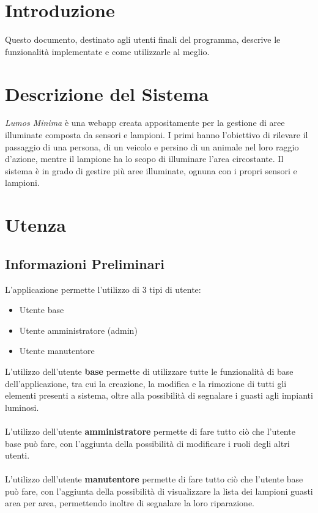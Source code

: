 \documentclass[a4paper, 12pt]{article}
\begin{document}
\makeindexdetails
\makefrontpage \makeversioni
\tableofcontents
\newpage
\clearpage
{}
\newpage
\section{Introduzione}
Questo documento, destinato agli utenti finali del programma, descrive le funzionalità implementate e come utilizzarle al meglio.

\newpage
\section{Descrizione del Sistema}
\textit{Lumos Minima} è una webapp creata appositamente per la gestione di aree illuminate composta da sensori e lampioni. I primi hanno l'obiettivo di rilevare il passaggio di una persona, di un veicolo e persino di un animale nel loro raggio d'azione, mentre il lampione ha lo scopo di illuminare l'area circostante. Il sistema è in grado di gestire più aree illuminate, ognuna con i propri sensori e lampioni.\\

\newpage
\section{Utenza}
\subsection{Informazioni Preliminari}
L'applicazione permette l'utilizzo di 3 tipi di utente:
\begin{itemize}
    \item Utente base
    \item Utente amministratore (admin)
    \item Utente manutentore
\end{itemize}
L'utilizzo dell'utente \textbf{base} permette di utilizzare tutte le funzionalità di base dell'applicazione, tra cui la creazione, la modifica e la rimozione di tutti gli elementi presenti a sistema, oltre alla possibilità di segnalare i guasti agli impianti luminosi.\\ \\
L'utilizzo dell'utente \textbf{amministratore} permette di fare tutto ciò che l'utente base può fare, con l'aggiunta della possibilità di modificare i ruoli degli altri utenti.\\ \\
L'utilizzo dell'utente \textbf{manutentore} permette di fare tutto ciò che l'utente base può fare, con l'aggiunta della possibilità di visualizzare la lista dei lampioni guasti area per area, permettendo inoltre di segnalare la loro riparazione.
\end{document}

